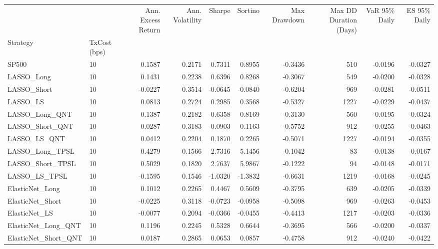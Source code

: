 \begin{tabular}{llrrrrrrrr}
\toprule
 &  & Ann. Excess Return & Ann. Volatility & Sharpe & Sortino & Max Drawdown & Max DD Duration (Days) & VaR 95\% Daily & ES 95\% Daily \\
Strategy & TxCost (bps) &  &  &  &  &  &  &  &  \\
\midrule
SP500 & 10 & 0.1587 & 0.2171 & 0.7311 & 0.8955 & -0.3436 & 510 & -0.0196 & -0.0327 \\
\cline{1-10}
LASSO\_Long & 10 & 0.1431 & 0.2238 & 0.6396 & 0.8268 & -0.3067 & 549 & -0.0200 & -0.0328 \\
\cline{1-10}
LASSO\_Short & 10 & -0.0227 & 0.3514 & -0.0645 & -0.0840 & -0.6204 & 969 & -0.0281 & -0.0511 \\
\cline{1-10}
LASSO\_LS & 10 & 0.0813 & 0.2724 & 0.2985 & 0.3568 & -0.5327 & 1227 & -0.0229 & -0.0437 \\
\cline{1-10}
LASSO\_Long\_QNT & 10 & 0.1387 & 0.2182 & 0.6358 & 0.8169 & -0.3130 & 560 & -0.0195 & -0.0324 \\
\cline{1-10}
LASSO\_Short\_QNT & 10 & 0.0287 & 0.3183 & 0.0903 & 0.1163 & -0.5752 & 912 & -0.0255 & -0.0463 \\
\cline{1-10}
LASSO\_LS\_QNT & 10 & 0.0412 & 0.2204 & 0.1870 & 0.2265 & -0.5071 & 1227 & -0.0194 & -0.0355 \\
\cline{1-10}
LASSO\_Long\_TPSL & 10 & 0.4279 & 0.1566 & 2.7316 & 5.1456 & -0.1042 & 83 & -0.0138 & -0.0167 \\
\cline{1-10}
LASSO\_Short\_TPSL & 10 & 0.5029 & 0.1820 & 2.7637 & 5.9867 & -0.1222 & 94 & -0.0148 & -0.0171 \\
\cline{1-10}
LASSO\_LS\_TPSL & 10 & -0.1595 & 0.1546 & -1.0320 & -1.3832 & -0.6631 & 1219 & -0.0168 & -0.0245 \\
\cline{1-10}
ElasticNet\_Long & 10 & 0.1012 & 0.2265 & 0.4467 & 0.5609 & -0.3795 & 639 & -0.0205 & -0.0339 \\
\cline{1-10}
ElasticNet\_Short & 10 & -0.0225 & 0.3118 & -0.0723 & -0.0958 & -0.5098 & 969 & -0.0263 & -0.0453 \\
\cline{1-10}
ElasticNet\_LS & 10 & -0.0077 & 0.2094 & -0.0366 & -0.0455 & -0.4413 & 1217 & -0.0203 & -0.0336 \\
\cline{1-10}
ElasticNet\_Long\_QNT & 10 & 0.1196 & 0.2245 & 0.5328 & 0.6644 & -0.3695 & 566 & -0.0200 & -0.0337 \\
\cline{1-10}
ElasticNet\_Short\_QNT & 10 & 0.0187 & 0.2865 & 0.0653 & 0.0857 & -0.4758 & 912 & -0.0240 & -0.0422 \\
\cline{1-10}

\end{tabular}
